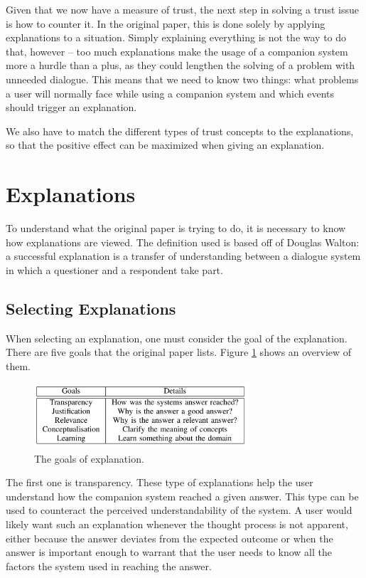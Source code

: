 \documentclass[a4paper]{article}
\begin{document}
Given that we now have a measure of trust, the next step in solving a trust issue is how to counter it. In the original paper, this is done solely by applying explanations to a situation. Simply explaining everything is not the way to do that, however – too much explanations make the usage of a companion system more a hurdle than a plus, as they could lengthen the solving of a problem with unneeded dialogue. This means that we need to know two things: what problems a user will normally face while using a companion system and which events should trigger an explanation.

We also have to match the different types of trust concepts to the explanations, so that the positive effect can be maximized when giving an explanation.

\section{Explanations}

To understand what the original paper is trying to do, it is necessary to know how explanations are viewed. The definition used is based off of Douglas Walton: a successful explanation is a transfer of understanding between a dialogue system in which a questioner and a respondent take part\cite{walton2004new}. 

\subsection{Selecting Explanations}

When selecting an explanation, one must consider the goal of the explanation. There are five goals that the original paper lists. Figure \ref{fig:goals} shows an overview of them.

\begin{figure}[H]
	\centering
	\includegraphics[width=8cm]{goals.png}
	\caption{The goals of explanation.}
	\label{fig:goals}
\end{figure}

The first one is transparency. These type of explanations help the user understand how the companion system reached a given answer. This type can be used to counteract the perceived understandability of the system. A user would likely want such an explanation whenever the thought process is not apparent, either because the answer deviates from the expected outcome or when the answer is important enough to warrant that the user needs to know all the factors the system used in reaching the answer.
\end{document}
